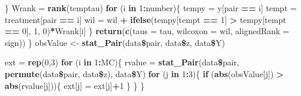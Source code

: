 \documentclass[]{article}
\newenvironment{Shaded}{\begin{snugshade}}{\end{snugshade}}
\newcommand{\KeywordTok}[1]{\textcolor[rgb]{0.13,0.29,0.53}{\textbf{#1}}}
\newcommand{\DataTypeTok}[1]{\textcolor[rgb]{0.13,0.29,0.53}{#1}}
\newcommand{\DecValTok}[1]{\textcolor[rgb]{0.00,0.00,0.81}{#1}}
\newcommand{\StringTok}[1]{\textcolor[rgb]{0.31,0.60,0.02}{#1}}
\newcommand{\ControlFlowTok}[1]{\textcolor[rgb]{0.13,0.29,0.53}{\textbf{#1}}}
\newcommand{\OperatorTok}[1]{\textcolor[rgb]{0.81,0.36,0.00}{\textbf{#1}}}
\newcommand{\NormalTok}[1]{#1}
\begin{document}
\begin{Shaded}
\begin{Highlighting}[]
\NormalTok{  \}}
\NormalTok{  Wrank =}\StringTok{ }\KeywordTok{rank}\NormalTok{(temptau)}
  \ControlFlowTok{for}\NormalTok{ (i }\ControlFlowTok{in} \DecValTok{1}\OperatorTok{:}\NormalTok{number)\{}
\NormalTok{    tempy =}\StringTok{ }\NormalTok{y[pair }\OperatorTok{==}\StringTok{ }\NormalTok{i]}
\NormalTok{    tempt =}\StringTok{ }\NormalTok{treatment[pair }\OperatorTok{==}\StringTok{ }\NormalTok{i]}
\NormalTok{    wil =}\StringTok{ }\NormalTok{wil }\OperatorTok{+}\StringTok{ }\KeywordTok{ifelse}\NormalTok{(tempy[tempt }\OperatorTok{==}\StringTok{ }\DecValTok{1}\NormalTok{] }\OperatorTok{>}\StringTok{ }\NormalTok{tempy[tempt }\OperatorTok{==}\StringTok{ }\DecValTok{0}\NormalTok{], }\DecValTok{1}\NormalTok{, }\DecValTok{0}\NormalTok{)}\OperatorTok{*}\NormalTok{Wrank[i]}
\NormalTok{  \}}
  \KeywordTok{return}\NormalTok{(}\KeywordTok{c}\NormalTok{(}\DataTypeTok{taus =}\NormalTok{ tau, }\DataTypeTok{wilcoxon =}\NormalTok{ wil, }\DataTypeTok{alignedRank =}\NormalTok{ sign))}
\NormalTok{\}}
\NormalTok{obsValue <-}\StringTok{ }\KeywordTok{stat_Pair}\NormalTok{(data}\OperatorTok{\$}\NormalTok{pair, data}\OperatorTok{\$}\NormalTok{z, data}\OperatorTok{\$}\NormalTok{Y)}
\end{Highlighting}
\end{Shaded}

\begin{Shaded}
\begin{Highlighting}[]
\NormalTok{ext =}\StringTok{ }\KeywordTok{rep}\NormalTok{(}\DecValTok{0}\NormalTok{,}\DecValTok{3}\NormalTok{)}
\ControlFlowTok{for}\NormalTok{ (i }\ControlFlowTok{in} \DecValTok{1}\OperatorTok{:}\NormalTok{MC)\{}
\NormalTok{  rvalue =}\StringTok{ }\KeywordTok{stat_Pair}\NormalTok{(data}\OperatorTok{\$}\NormalTok{pair, }\KeywordTok{permute}\NormalTok{(data}\OperatorTok{\$}\NormalTok{pair, data}\OperatorTok{\$}\NormalTok{z), data}\OperatorTok{\$}\NormalTok{Y)}
  \ControlFlowTok{for}\NormalTok{ (j }\ControlFlowTok{in} \DecValTok{1}\OperatorTok{:}\DecValTok{3}\NormalTok{)\{}
    \ControlFlowTok{if}\NormalTok{ (}\KeywordTok{abs}\NormalTok{(obsValue[j]) }\OperatorTok{>}\StringTok{ }\KeywordTok{abs}\NormalTok{(rvalue[j]))\{}
\NormalTok{      ext[j] =}\StringTok{ }\NormalTok{ext[j]}\OperatorTok{+}\DecValTok{1}
\NormalTok{    \}}
\NormalTok{  \}}
\NormalTok{\}}
\end{Highlighting}
\end{Shaded}
\end{document}
